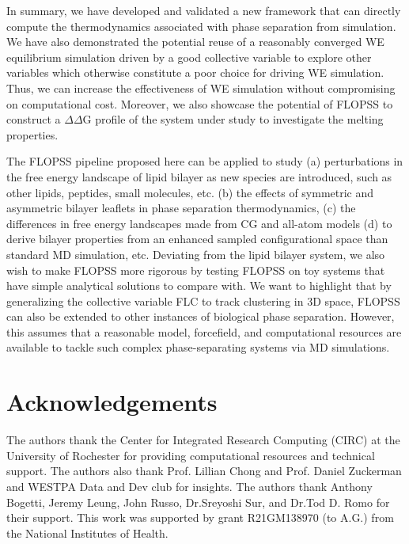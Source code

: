 \documentclass{biophys-new}
\begin{document}
In summary, we have developed and validated a new framework that can directly compute the thermodynamics associated with phase separation from simulation.
We have also demonstrated the potential reuse of a reasonably converged WE equilibrium simulation driven by a good collective variable to explore other variables which otherwise constitute a poor choice for driving WE simulation.
Thus, we can increase the effectiveness of WE simulation without compromising on computational cost.
Moreover, we also showcase the potential of FLOPSS to construct a $\Delta\Delta$G profile of the system under study to investigate the melting properties.

The FLOPSS pipeline proposed here can be applied to study (a) perturbations in the free energy landscape of lipid bilayer as new species are introduced, such as other lipids, peptides, small molecules, etc.
(b) the effects of symmetric and asymmetric bilayer leaflets in phase separation thermodynamics,
(c) the differences in free energy landscapes made from CG and all-atom models 
(d) to derive bilayer properties from an enhanced sampled configurational space than standard MD simulation, etc. 
Deviating from the lipid bilayer system, we also wish to make FLOPSS more rigorous by testing FLOPSS on toy systems that have simple analytical solutions to compare with. 
We want to highlight that by generalizing the collective variable FLC to track clustering in 3D space, FLOPSS can also be extended to other instances of biological phase separation.
However, this assumes that a reasonable model, forcefield, and computational resources are available to tackle such complex phase-separating systems via MD simulations.


\section*{Acknowledgements}

The authors thank the Center for Integrated Research Computing (CIRC) at the University of Rochester for providing
computational resources and technical support. The authors also thank Prof. Lillian Chong and Prof. Daniel Zuckerman and
WESTPA Data and Dev club for insights. The authors thank Anthony Bogetti, Jeremy Leung, John Russo, Dr.Sreyoshi Sur, and Dr.Tod D. Romo for their support.
This work was supported by grant R21GM138970 (to A.G.) from the National Institutes of Health.



\end{document}
